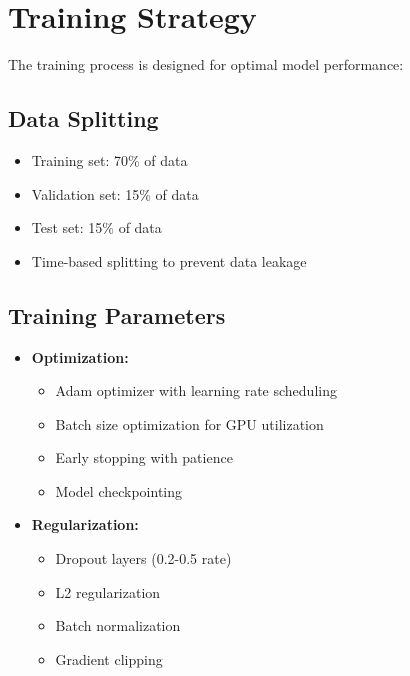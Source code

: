 \documentclass[12pt,a4paper]{report}
\begin{document}
\section{Training Strategy}
The training process is designed for optimal model performance:

\subsection{Data Splitting}
\begin{itemize}
\item Training set: 70\% of data
\item Validation set: 15\% of data
\item Test set: 15\% of data
\item Time-based splitting to prevent data leakage
\end{itemize}

\subsection{Training Parameters}
\begin{itemize}
\item \textbf{Optimization:}
  \begin{itemize}
    \item Adam optimizer with learning rate scheduling
    \item Batch size optimization for GPU utilization
    \item Early stopping with patience
    \item Model checkpointing
  \end{itemize}

\item \textbf{Regularization:}
  \begin{itemize}
    \item Dropout layers (0.2-0.5 rate)
    \item L2 regularization
    \item Batch normalization
    \item Gradient clipping
  \end{itemize}
\end{itemize}


\begin{table}[htbp]
\caption{Sample Table}
\vspace{0.5cm}
\end{table}
\end{document}
